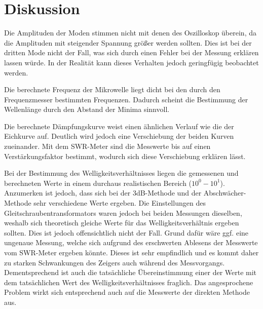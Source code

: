 \section{Diskussion}
\label{sec:Diskussion}
Die Amplituden der Moden stimmen nicht mit denen des Oszilloskop überein, da die
Amplituden mit steigender Spannung größer werden sollten.  Dies ist bei der
dritten Mode nicht der Fall, was sich durch einen Fehler bei der Messung erklären lassen würde.
In der Realität kann dieses Verhalten jedoch geringfügig beobachtet werden.


Die berechnete Frequenz der Mikrowelle liegt dicht bei den durch den Frequenzmesser
bestimmten Frequenzen. Dadurch scheint die Bestimmung der Wellenlänge durch den Abstand der Minima
sinnvoll.

Die berechnete Dämpfungskurve weist einen ähnlichen Verlauf wie die der Eichkurve auf.
Deutlich wird jedoch eine Verschiebung der beiden Kurven zueinander. Mit dem
SWR-Meter sind die Messwerte bis auf einen Verstärkungsfaktor bestimmt, wodurch sich diese
Verschiebung erklären lässt.


Bei der Bestimmung des Welligkeitsverhältnisses liegen die gemessenen und berechneten
Werte in einem durchaus realistischen Bereich ($10^0 - 10^1$). Anzumerken ist jedoch,
dass sich bei der 3dB-Methode und der Abschwächer-Methode sehr verschiedene Werte
ergeben. Die Einstellungen des Gleitschraubentransformators waren jedoch bei beiden
Messungen dieselben, weshalb sich theoretisch gleiche Werte für das Welligkeitsverhältnis
ergeben sollten. Dies ist jedoch offensichtlich nicht der Fall. Grund dafür wäre ggf.
eine ungenaue Messung, welche sich aufgrund des erschwerten Ablesens der
Messwerte vom SWR-Meter ergeben könnte. Dieses ist sehr empfindlich und es kommt
daher zu starken Schwankungen des Zeigers auch während des Messvorgangs.
Dementsprechend ist auch die tatsächliche Übereinstimmung einer der Werte mit
dem tatsächlichen Wert des Welligkeitsverhältnisses fraglich. Das angesprochene
Problem wirkt sich entsprechend auch auf die Messwerte der direkten Methode aus.
